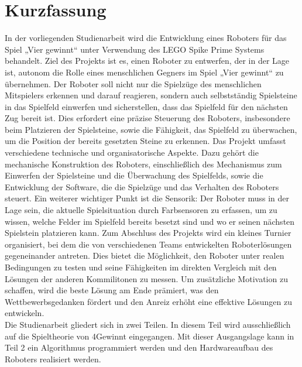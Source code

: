 \chapter*{Kurzfassung} %

In der vorliegenden Studienarbeit wird die Entwicklung eines Roboters für das Spiel „Vier gewinnt“ unter Verwendung des LEGO Spike Prime Systems behandelt. Ziel des Projekts ist es, einen Roboter zu entwerfen, der in der Lage ist, autonom die Rolle eines menschlichen Gegners im Spiel „Vier gewinnt“ zu übernehmen. Der Roboter soll nicht nur die Spielzüge des menschlichen Mitspielers erkennen und darauf reagieren, sondern auch selbstständig Spielsteine in das Spielfeld einwerfen und sicherstellen, dass das Spielfeld für den nächsten Zug bereit ist. Dies erfordert eine präzise Steuerung des Roboters, insbesondere beim Platzieren der Spielsteine, sowie die Fähigkeit, das Spielfeld zu überwachen, um die Position der bereits gesetzten Steine zu erkennen.
Das Projekt umfasst verschiedene technische und organisatorische Aspekte. Dazu gehört die mechanische Konstruktion des Roboters, einschließlich des Mechanismus zum Einwerfen der Spielsteine und die Überwachung des Spielfelds, sowie die Entwicklung der Software, die die Spielzüge und das Verhalten des Roboters steuert. Ein weiterer wichtiger Punkt ist die Sensorik: Der Roboter muss in der Lage sein, die aktuelle Spielsituation durch Farbsensoren zu erfassen, um zu wissen, welche Felder im Spielfeld bereits besetzt sind und wo er seinen nächsten Spielstein platzieren kann.
Zum Abschluss des Projekts wird ein kleines Turnier organisiert, bei dem die von verschiedenen Teams entwickelten Roboterlösungen gegeneinander antreten. Dies bietet die Möglichkeit, den Roboter unter realen Bedingungen zu testen und seine Fähigkeiten im direkten Vergleich mit den Lösungen der anderen Kommilitonen zu messen. Um zusätzliche Motivation zu schaffen, wird die beste Lösung am Ende prämiert, was den Wettbewerbsgedanken fördert und den Anreiz erhöht eine effektive Lösungen zu entwickeln. \\
Die Studienarbeit gliedert sich in zwei Teilen. In diesem Teil wird ausschließlich auf die Spieltheorie von 4Gewinnt eingegangen. Mit dieser Ausgangslage kann in Teil 2 ein Algorithmus programmiert werden und den Hardwareaufbau des Roboters realisiert werden.

\clearpage


